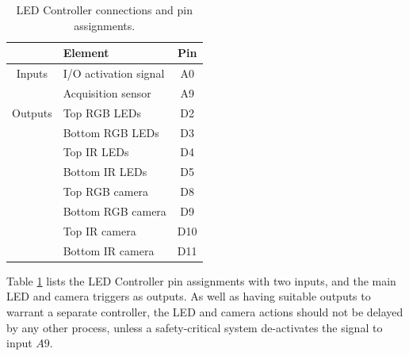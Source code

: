 \documentclass[fleqn,twoside,12pt]{report}
\begin{document}
\begin{table}[h]
	\centering
	\caption{LED Controller connections and pin assignments.}
	\label{tab:LED_tasks}
	\begin{tabular}{clc}
		\toprule
		  			& \textbf{Element} & \textbf{Pin} \\[8pt]
		\midrule
		Inputs 		& I/O activation signal & A0 \\[4pt]
		 			& Acquisition sensor 	& A9 \\[4pt]
				
		Outputs		& Top RGB LEDs			& D2  \\[4pt]
					& Bottom RGB LEDs		& D3  \\[4pt]
					& Top IR LEDs			& D4  \\[4pt]
					& Bottom IR LEDs		& D5  \\[4pt]
				 	& Top RGB camera 		& D8  \\[4pt]
					& Bottom RGB camera		& D9  \\[4pt]
					& Top IR camera			& D10  \\[4pt]
					& Bottom IR camera		& D11  \\[4pt]
		\bottomrule
		
	\end{tabular}
\end{table}
 

Table \ref{tab:LED_tasks} lists the LED Controller pin assignments with two inputs, and the main LED and camera triggers as outputs. As well as having suitable outputs to warrant a separate controller, the LED and camera actions should not be delayed by any other process, unless a safety-critical system de-activates the signal to input $A9$.
\end{document}
